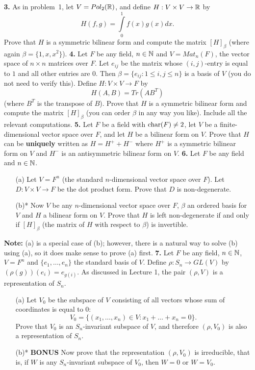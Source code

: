 \documentclass[12pt]{amsart}
\begin{document}
\skv
{\bf 3.} As in problem~1, let $V=Pol_2({\mathbb R})$, and define $H:V\times V\to{\mathbb R}$ by $$H(f,g)=\int\limits_{0}^1 f(x)g(x)dx.$$ Prove that $H$ is a symmetric bilinear form and
compute the matrix $[H]_{\beta}$ (where again $\beta=\{1,x,x^2\}$).
\skv
{\bf 4.} Let $F$ be any field, $n\in{\mathbb N}$ and $V=Mat_n(F)$, the vector space of $n\times n$ matrices over $F$. Let $e_{ij}$ be the matrix whose
$(i,j)$-entry is equal to $1$ and all other entries are $0$. Then $\beta=\{e_{ij}: 1\leq i,j\leq n\}$ is a basis of $V$ (you do not need to verify this). Define $H:V\times V\to F$ by
$$H(A,B)=Tr(AB^T)$$ 
(where $B^T$ is the transpose of $B$).
Prove that $H$ is a symmetric bilinear form and compute the matrix $[H]_{\beta}$ (you can order $\beta$ in any way you like).
Include all the relevant computations.
\skv
{\bf 5.} Let $F$ be a field with ${\rm char}(F)\neq 2$, let $V$ be a finite-dimensional vector space over $F$, and let $H$ be a bilinear form on $V$. Prove that
$H$ can be {\bf uniquely} written as $H=H^++H^-$ where $H^+$ is a symmetric bilinear form on $V$ and $H^-$ is an antisymmetric bilinear form on $V$.
\skv
{\bf 6.} Let $F$ be any field and $n\in{\mathbb N}$. 
\begin{itemize}
\item[(a)] Let $V=F^n$ (the standard $n$-dimensional vector space over $F$). Let $D:V\times V\to F$ be the dot product form. Prove that $D$ is non-degenerate.
\item[(b)*] Now $V$ be any $n$-dimensional vector space over $F$, $\beta$ an ordered basis for $V$ and $H$ a bilinear form on $V$. Prove that $H$ is left non-degenerate if and only if $[H]_{\beta}$ (the matrix of $H$ with respect to $\beta$) is invertible. 
\end{itemize}
{\bf Note:} (a) is a special case of (b); however, there is a natural way to solve (b) using (a), so it does make sense to prove (a) first.
\skv
{\bf 7.} Let $F$ be any field, $n\in{\mathbb N}$, $V=F^n$ and $\{e_1,\ldots, e_n\}$ the standard basis of $V$. Define $\rho:S_n\to GL(V)$ by
$(\rho(g))(e_i)=e_{g(i)}$. As discussed in Lecture 1, the pair $(\rho,V)$ is a representation of $S_n$.
\begin{itemize}
\item[(a)] Let $V_0$ be the subspace of $V$ consisting of all vectors whose sum of coordinates is equal to $0$:
$$V_0=\{(x_1,\ldots, x_n)\in V: x_1+\ldots+x_n=0\}.$$ Prove that $V_0$ is an $S_n$-invariant subspace of $V$, and therefore $(\rho,V_0)$ is also a representation of $S_n$.
\item[(b)*]{\bf BONUS} Now prove that the representation $(\rho,V_0)$ is irreducible, that is, if $W$ is any $S_n$-invariant subspace of $V_0$, then
$W=0$ or $W=V_0$. 
\end{itemize}
\end{document}
